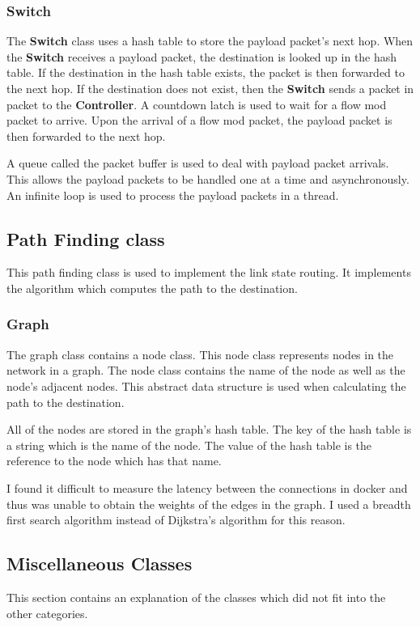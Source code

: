 \documentclass{article}
\begin{document}
\subsubsection{Switch}
The \textbf{Switch} class uses a hash table to store the payload packet's next
hop. When the \textbf{Switch} receives a payload packet, the destination is
looked up in the hash table. If the destination in the hash table exists, the
packet is then forwarded to the next hop. If the destination does not exist,
then the \textbf{Switch} sends a packet in packet to the \textbf{Controller}.
A countdown latch is used to wait for a flow mod packet to arrive. Upon the
arrival of a flow mod packet, the payload packet is then forwarded to the
next hop.

A queue called the packet buffer is used to deal with payload packet arrivals.
This allows the payload packets to be handled one at a time and asynchronously.
An infinite loop is used to process the payload packets in a thread.

\subsection{Path Finding class}
This path finding class is used to implement the link state routing. It
implements the algorithm which computes the path to the destination.

\subsubsection{Graph}
The graph class contains a node class. This node class represents nodes in the
network in a graph. The node class contains the name of the node as well as the
node's adjacent nodes. This abstract data structure is used when calculating the
path to the destination.

All of the nodes are stored in the graph's hash table. The key of the hash
table is a string which is the name of the node. The value of the hash table is
the reference to the node which has that name.

I found it difficult to measure the latency between the connections in docker
and thus was unable to obtain the weights of the edges in the graph. I used a
breadth first search algorithm instead of Dijkstra's algorithm for this reason.

\subsection{Miscellaneous Classes}
This section contains an explanation of the classes which did not fit into the
other categories.
\end{document}
